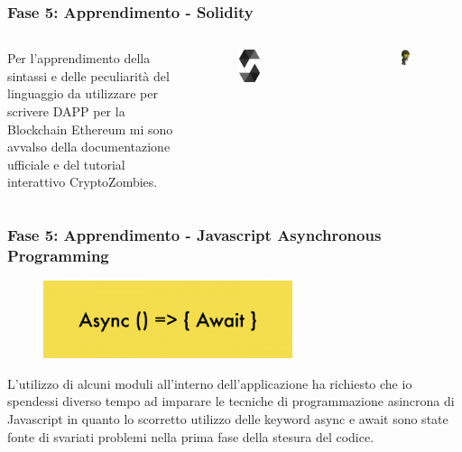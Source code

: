 \documentclass{beamer}
\begin{document}
\begin{frame}
	\frametitle{Fase 5: Apprendimento - Solidity}
	\begin{columns}
		Per l’apprendimento della sintassi e delle peculiarità del linguaggio da utilizzare per scrivere DAPP per la Blockchain Ethereum mi sono avvalso della documentazione ufficiale e del tutorial interattivo CryptoZombies.	
		\begin{figure}
			\includegraphics[width=0.30\textwidth]{figures/solidity.png}
		\end{figure}
		\begin{figure}
			\includegraphics[width=0.40\textwidth]{figures/zombie.png}
		\end{figure}
	\end{columns}
\end{frame}
\begin{frame}
	\frametitle{Fase 5: Apprendimento - Javascript Asynchronous Programming}	
	\begin{figure}
		\includegraphics[width=0.65\textwidth]{figures/async.jpg}
	\end{figure}
	L’utilizzo di alcuni moduli all’interno dell’applicazione ha richiesto che io spendessi diverso tempo ad imparare le tecniche di programmazione asincrona di Javascript in quanto lo scorretto utilizzo delle keyword async e await sono state fonte di svariati problemi nella prima fase della stesura del codice.
\end{frame}
\end{document}
